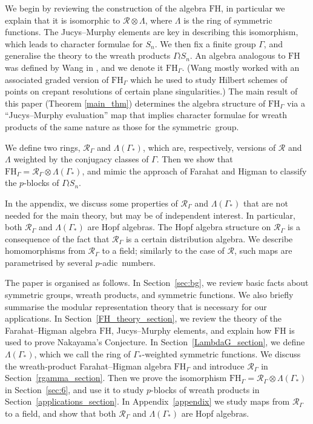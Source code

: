 \documentclass[ALCO,Unicode]{cedram}
\newcommand{\RGamma}{\mathcal{R}_{\Gamma}}
\newcommand{\LambdaG}{\Lambda(\Gamma_*)}
\newcommand{\FH}{\mathrm{FH}}
\newcommand{\FHG}{\mathrm{FH}_{\Gamma}}
\newcommand{\FH}{\mathrm{FH}}
\newcommand{\RGamma}{\mathcal{R}_{\Gamma}}
\newcommand{\LambdaG}{\Lambda(\Gamma_*)}
\newcommand{\FHG}{\mathrm{FH}_{\Gamma}}
\begin{document}
We begin by reviewing the construction of the algebra $\FH$, in particular we explain that it is isomorphic to $\mathcal{R} \otimes \Lambda$, where $\Lambda$ is the ring of symmetric functions. The Jucys--Murphy elements are key in describing this isomorphism, which leads to character formulae for $S_n$. We then fix a finite group $\Gamma$, and generalise the theory to the wreath products $\Gamma \wr S_n$. An algebra analogous to $\FH$ was defined by Wang in \cite{Wang1}, and we denote it $\FHG$. (Wang mostly worked with an associated graded version of $\FHG$ which he used to study Hilbert schemes of points on crepant resolutions of certain plane singularities.) The main result of this paper (Theorem \ref{main_thm}) determines the algebra structure of $\FHG$ via a ``Jucys--Murphy evaluation'' map that implies character formulae for wreath products of the same nature as those for the symmetric~group.

We define two rings, $\RGamma$ and $\LambdaG$, which are, respectively, versions of $\mathcal{R}$ and $\Lambda$ weighted by the conjugacy classes of $\Gamma$. Then we show that $\FHG = \RGamma \otimes \LambdaG$, and mimic the approach of Farahat and Higman to classify the $p$-blocks of $\Gamma \wr S_n$.  

In the appendix, we discuss some properties of $\RGamma$ and $\LambdaG$ that are not needed for the main theory, but may be of independent interest. In particular, both $\RGamma$ and $\LambdaG$ are Hopf algebras. The Hopf algebra structure on $\RGamma$ is a consequence of the fact that $\RGamma$ is a certain distribution algebra. We describe homomorphisms from $\RGamma$ to a field; similarly to the case of $\mathcal{R}$, such maps are parametrised by several $p$-adic~numbers.

The paper is organised as follows. In Section~\ref{sec:bg}, we review basic facts about symmetric groups, wreath products, and symmetric functions. 
We also briefly summarise the modular representation theory that is necessary for our applications.
In Section~\ref{FH_theory_section}, we review the theory of the Farahat--Higman algebra $\FH$, Jucys--Murphy elements, and explain how $\FH$ is used to prove Nakayama's Conjecture.
In Section~\ref{LambdaG_section}, we define $\LambdaG$, which we call the ring of $\Gamma_*$-weighted symmetric functions.
We discuss the wreath-product Farahat--Higman algebra $\FHG$ and introduce $\RGamma$ in Section~\ref{rgamma_section}.
Then we prove the isomorphism $\FHG = \RGamma \otimes \LambdaG$ in Section~\ref{sec:6}, and use it to study $p$-blocks of wreath products in Section~\ref{applications_section}. 
In  Appendix~\ref{appendix} we study maps from $\RGamma$ to a field, and show that both $\RGamma$ and $\LambdaG$ are Hopf algebras.
\end{document}
